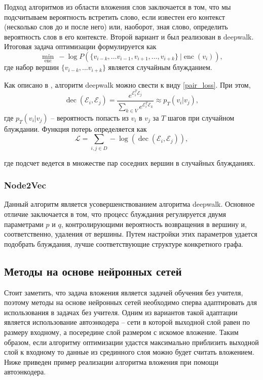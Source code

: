 \documentclass[12pt,a4paper]{extarticle}
\newcommand{\E}{\mathcal{E}}
\newcommand{\Loss}{\mathcal{L}}
\newcommand{\encoder}{\operatorname{enc}}
\newcommand{\decoder}{\operatorname{dec}}
\begin{document}
    Подход алгоритмов из области вложения слов заключается в том, что мы подсчитываем вероятность встретить слово, если известен его контекст (несколько слов до и после него) или, наоборот, зная слово, определить вероятность слов в его контексте. Второй вариант и был реализован в deepwalk. Итоговая задача оптимизации формулируется как
    \[
    \min_{\encoder}\ - \log P(\{v_{i-k}, \dots v_{i-1}, v_{i+1}, \dots, v_{i+k}\}\ | \encoder(v_i)),
    \]
    где набор вершин $\{v_{i-k}, \dots v_{i+k}\}$ является случайным блужданием.
    
    Как описано в \cite{survey2}, алгоритм deepwalk можно свести к виду \eqref{pair_loss}. При этом,
    \[
    \decoder(\E_i, \E_j) = \frac{e^{\E_i^T\E_j}}{\sum_{k \in V} e^{\E_i^T\E_k}} \approx p_T(v_i | v_j),
    \]
    где $p_T(v_i | v_j)$ -- вероятность попасть из $v_i$ в $v_j$ за $T$ шагов при случайном блуждании. Функция потерь определяется как
    \[
    \Loss = \sum_{i, j \in D} -\log(\decoder(\E_i, \E_j)),
    \]
    
    где подсчет ведется в множестве пар соседних вершин в случайных блужданиях.
    
    \subsubsection{Node2Vec \cite{node2vec}}
    Данный алгоритм является усовершенствованием алгоритма deepwalk.
    Основное отличие заключается в том, что процесс блуждания регулируется двумя параметрами $p$ и $q$, контролирующими вероятность возвращения в вершину и, соответственно, удаления от вершины.
    Путем настройки этих параметров удается подобрать блуждания, лучше соответствующие структуре конкретного графа.
    
    \subsection{Методы на основе нейронных сетей}
    Стоит заметить, что задача вложения является задачей обучения без учителя, поэтому методы на основе нейронных сетей необходимо сперва адаптировать для использования в задачах без учителя.
    Одним из вариантов такой адаптации является использование автоэнкодера -- сети в которой выходной слой равен по размеру входному, а посередине слой размером с искомое вложение.
    Таким образом, если алгоритму оптимизации удастся максимально приблизить выходной слой к входному то данные из срединного слоя можно будет считать вложением.
    Ниже приведен пример реализации алгоритма вложения при помощи автоэнкодера.
    
\end{document}
